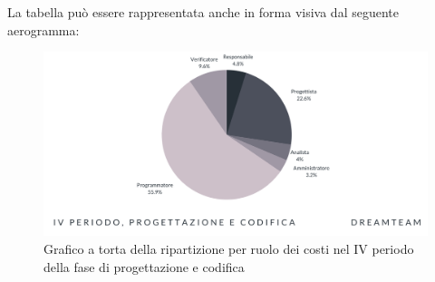 La tabella può essere rappresentata anche in forma visiva dal seguente aerogramma:
\begin{figure}[!h]
\centering
\includegraphics[scale=0.65]{Sezioni/SezioniPreventivo/grafici/Progettazione_IV_periodo_costi.png}
\caption{Grafico a torta della ripartizione per ruolo dei costi nel IV periodo della fase di progettazione e codifica}
\end{figure}


